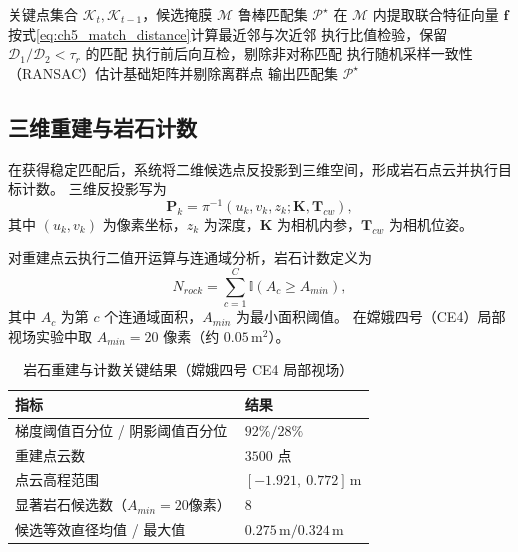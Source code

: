 \documentclass[UTF8,zihao=-4,a4paper,oneside,openany]{ctexrep}
\numberwithin{equation}{chapter}
\renewcommand{\small}{\normalsize}
\renewcommand{\small}{\normalsize}
\theoremstyle{plain}
\theoremstyle{definition}
\begin{document}
\begin{algorithm}[H]
\caption{岩石特征匹配流程}
\label{alg:ch5_rock_matching}
\begin{algorithmic}[1]
\REQUIRE 关键点集合 $\mathcal{K}_t,\mathcal{K}_{t-1}$，候选掩膜 $\mathcal{M}$
\ENSURE 鲁棒匹配集 $\mathcal{P}^\star$
\STATE 在 $\mathcal{M}$ 内提取联合特征向量 $\mathbf{f}$
\STATE 按式\eqref{eq:ch5_match_distance}计算最近邻与次近邻
\STATE 执行比值检验，保留 $\mathcal{D}_1/\mathcal{D}_2<\tau_r$ 的匹配
\STATE 执行前后向互检，剔除非对称匹配
\STATE 执行随机采样一致性（RANSAC）估计基础矩阵并剔除离群点
\STATE 输出匹配集 $\mathcal{P}^\star$
\end{algorithmic}
\end{algorithm}

\subsection{三维重建与岩石计数}
\label{subsec:ch5_reconstruction_counting}

在获得稳定匹配后，系统将二维候选点反投影到三维空间，形成岩石点云并执行目标计数。
三维反投影写为
\begin{equation}
\mathbf{P}_k=\pi^{-1}\!\left(u_k,v_k,z_k;\mathbf{K},\mathbf{T}_{cw}\right),
\label{eq:ch5_back_project}
\end{equation}
其中 $(u_k,v_k)$ 为像素坐标，$z_k$ 为深度，$\mathbf{K}$ 为相机内参，$\mathbf{T}_{cw}$ 为相机位姿。

对重建点云执行二值开运算与连通域分析，岩石计数定义为
\begin{equation}
N_{rock}=\sum_{c=1}^{C}\mathbb{I}(A_c\ge A_{min}),
\label{eq:ch5_counting}
\end{equation}
其中 $A_c$ 为第 $c$ 个连通域面积，$A_{min}$ 为最小面积阈值。
在嫦娥四号（CE4）局部视场实验中取 $A_{min}=20$ 像素（约 $0.05\,\mathrm{m}^2$）。

\begin{table}[H]
	\centering
	\small
	\caption{岩石重建与计数关键结果（嫦娥四号 CE4 局部视场）}
	\label{tab:ch5_reconstruction_metrics}
	\begin{tabular}{p{}p{}}
		\toprule
		指标 & 结果 \\
		\midrule
		梯度阈值百分位 / 阴影阈值百分位 & $92\% / 28\%$ \\
		重建点云数 & $3500$ 点 \\
		点云高程范围 & $[-1.921,\ 0.772]\,\mathrm{m}$ \\
		显著岩石候选数（$A_{min}=20$像素） & $8$ \\
		候选等效直径均值 / 最大值 & $0.275\,\mathrm{m} / 0.324\,\mathrm{m}$ \\
		\bottomrule
	\end{tabular}
\end{table}
\end{document}
